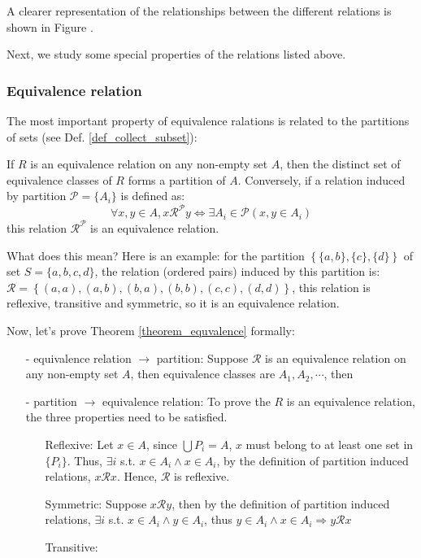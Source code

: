 A clearer representation of the relationships between the different relations is shown in Figure .

Next, we study some special properties of the relations listed above.

\subsubsection*{Equivalence relation}
The most important property of equivalence ralations is related to the partitions of sets (see Def. \ref{def_collect_subset}):
\begin{theorem}\label{theorem_equvalence}
    If $R$ is an equivalence relation on any non-empty set $A$, then the distinct set of equivalence classes of $R$ forms a partition of $A$.
    Conversely, if a relation induced by partition $\mathcal{P}=\{A_i\}$ is defined as:
    $$
    \forall x,y\in A, x\mathcal{R}^{\mathcal{P}}y \Leftrightarrow \exists A_i \in \mathcal{P}(x,y\in A_i)
    $$
    this relation $\mathcal{R}^{\mathcal{P}}$ is an equivalence relation.
\end{theorem}

What does this mean? Here is an example: for the partition $\left\{\{a,b\},\{c\},\{d\}\right\}$ of set $S=\{a,b,c,d\}$, the relation (ordered pairs) induced by this partition 
is: $\mathcal{R}=\left\{(a,a),(a,b),(b,a),(b,b),(c,c),(d,d)\right\}$, this relation is reflexive, transitive and symmetric, so it is an equivalence relation.

Now, let's prove Theorem \ref{theorem_equvalence} formally:
\begin{enumerate}
    \item[-] equivalence relation $\rightarrow$ partition:
    Suppose $\mathcal{R}$ is an equivalence relation on any non-empty set $A$, then equivalence classes are $A_1,A_2,\cdots$, then 
    \item[-] partition $\rightarrow$ equivalence relation:
    To prove the $R$ is an equivalence relation, the three properties need to be satisfied.
    \begin{enumerate}
        \item[Reflexive:] Let $x\in A$, since $\bigcup P_i=A$, $x$ must belong to at least one set in $\{P_i\}$. Thus, $\exists i$ s.t. $x\in A_i \wedge x\in A_i$, by the definition of partition induced relations, $x\mathcal{R}x$. Hence, $\mathcal{R}$ is reflexive.
        \item[Symmetric:] Suppose $x\mathcal{R}y$, then by the definition of partition induced relations, $\exists i$ s.t. $x\in A_i \wedge y\in A_i$, thus $y \in A_i \wedge x\in A_i\Rightarrow y\mathcal{R}x$
        \item[Transitive:]   
    \end{enumerate}
\end{enumerate}